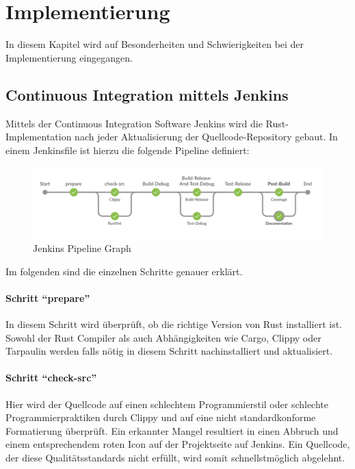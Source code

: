 
\chapter{Implementierung}

In diesem Kapitel wird auf Besonderheiten und Schwierigkeiten bei der Implementierung eingegangen.



\section{Continuous Integration mittels Jenkins}

Mittels der Continuous Integration Software Jenkins wird die Rust-Implementation nach jeder Aktualisierung der Quellcode-Repository gebaut.
In einem Jenkinsfile ist hierzu die folgende Pipeline definiert:

\begin{figure}[H]
	\includegraphics[width=\textwidth]{images/jenkins_pipeline_graph.png}
	\caption{Jenkins Pipeline Graph}
	\label{impl:jenkins:pipeline:graph}
\end{figure}

Im folgenden sind die einzelnen Schritte genauer erklärt.


\subsubsection{Schritt \enquote{prepare}}
In diesem Schritt wird überprüft, ob die richtige Version von Rust installiert ist.
Sowohl der Rust Compiler als auch Abhängigkeiten wie Cargo, Clippy oder Tarpaulin werden falls nötig  in diesem Schritt nachinstalliert und aktualisiert.

\subsubsection{Schritt \enquote{check-src}}
Hier wird der Quellcode auf einen schlechtem Programmierstil oder schlechte Programmierpraktiken durch Clippy und auf eine nicht standardkonforme Formatierung überprüft.
Ein erkannter Mangel resultiert in einen Abbruch und einem entsprechendem roten Icon auf der Projektseite auf Jenkins.
Ein Quellcode, der diese Qualitätsstandards nicht erfüllt, wird somit schnellstmöglich abgelehnt.


